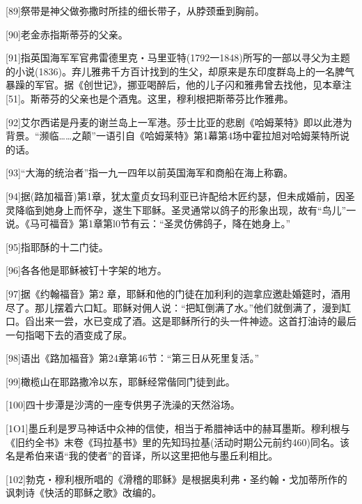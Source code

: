 \documentclass{article}
\begin{document}
[89]祭带是神父做弥撒时所挂的细长带子，从脖颈垂到胸前。



[90]老金赤指斯蒂芬的父亲。



[91]指英国海军军官弗雷德里克・马里亚特(1792一1848)所写的一部以寻父为主题的小说(1836)。弃儿雅弗千方百计找到的生父，却原来是东印度群岛上的一名脾气暴躁的军官。据《创世记》，挪亚喝醉后，他的儿子闪和雅弗曾去找他，见本章注[51]。斯蒂芬的父亲也是个酒鬼。这里，穆利根把斯蒂芬比作雅弗。



[92]艾尔西诺是丹麦的谢兰岛上一军港。莎士比亚的悲剧《哈姆莱特》即以此港为背景。“濒临……之颠”一语引自《哈姆莱特》第1幕第4场中霍拉旭对哈姆莱特所说的话。



[93]“大海的统治者”指一九一四年以前英国海军和商船在海上称霸。



[94]据(路加福音)第1章，犹太童贞女玛利亚已许配给木匠约瑟，但未成婚前，因圣灵降临到她身上而怀孕，遂生下耶稣。圣灵通常以鸽子的形象出现，故有“鸟儿”一说。《马可福音》第1章第l0节有云：“圣灵仿佛鸽子，降在她身上。”



[95]指耶酥的十二门徒。



[96]各各他是耶稣被钉十字架的地方。



[97]据《约翰福音》第2 章，耶稣和他的门徒在加利利的迦拿应邀赴婚筵时，酒用尽了。那儿摆着六口缸。耶稣对佣人说：“把缸倒满了水。”他们就倒满了，漫到缸口。舀出来一尝，水已变成了酒。这是耶稣所行的头一件神迹。这首打油诗的最后一句指喝下去的酒变成了尿。



[98]语出《路加福音》第24章第46节：“第三日从死里复活。”



[99]橄榄山在耶路撒冷以东，耶稣经常偕同门徒到此。



[100]四十步潭是沙湾的一座专供男子洗澡的天然浴场。



[1O1]墨丘利是罗马神话中众神的信使，相当于希腊神话中的赫耳墨斯。穆利根与《旧约全书》末卷《玛拉基书》里的先知玛拉基(活动时期公元前约460)同名。该名是希伯来语“我的使者”的音译，所以这里把他与墨丘利相比。



[102]勃克・穆利根所唱的《滑稽的耶稣》是根据奥利弗・圣约翰・戈加蒂所作的讽刺诗《快活的耶稣之歌》改编的。
\end{document}

